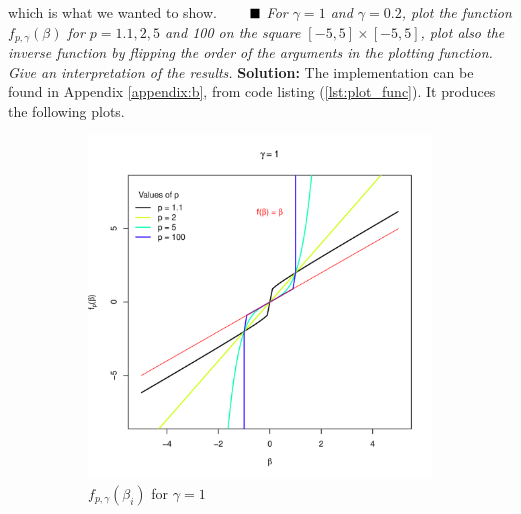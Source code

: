 which is what we wanted to show. $\Q$
\emph{For $\gamma = 1$ and $\gamma = 0.2$, plot the function $  f_{p, \gamma}(\beta)$  for $p = 1.1, 2, 5$ and 100 on the square $[-5, 5] \times [-5, 5]$, plot also the inverse function by flipping the order of the arguments in the plotting function. Give an interpretation of the results.} \spaze 
\textbf{Solution:} \spaze 
The implementation can be found in Appendix \ref{appendix:b}, from code listing  (\ref{lst:plot_func}). It produces the following plots. 
\begin{figure}[H]
  \centering
  \begin{subfigure}{0.45\textwidth}
    \centering
    \includegraphics[width=\linewidth]{Images/Figures_Exercise_1/penal_1.pdf} %
    \caption{$f_{p, \gamma}(\beta_i)$ for $\gamma = 1$}
    \label{fig:penal_1}
  \end{subfigure}
  \hfill
  \begin{subfigure}{0.45\textwidth}
    \centering

\end{subfigure}
\end{figure}
